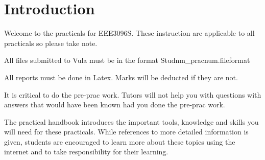 \section*{Introduction}
Welcome to the practicals for EEE3096S. These instruction are applicable to all practicals so please take note.

All files submitted to Vula must be in the format Studnm\_pracnum.fileformat

All reports must be done in Latex. Marks will be deducted if they are not.

It is critical to do the pre-prac work. Tutors will not help you with questions with answers that would have been known had you done the pre-prac work. 

The practical handbook introduces the important tools, knowledge and skills you will need for these practicals. While references to more detailed information is given, students are encouraged to learn more about these topics using the internet and to take responsibility for their learning.







